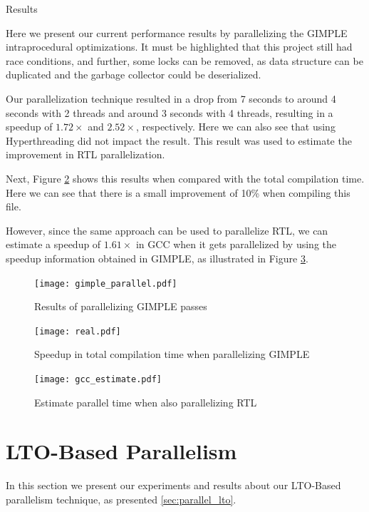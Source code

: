 \begin{subsection}{Results}\label{sec:threaded-results}

Here we present our current performance results by parallelizing the GIMPLE
intraprocedural optimizations. It must be highlighted that this project still had
race conditions, and further, some locks can be
removed, as data structure can be duplicated and the garbage collector could be
deserialized.

Our parallelization technique resulted in a drop from 7 seconds to around 4
seconds with 2 threads and around 3 seconds with 4 threads, resulting in a
speedup of $1.72\times$ and $2.52\times$, respectively. Here we can also see
that using Hyperthreading did not impact the result. This result was used to
estimate the improvement in RTL parallelization.

Next, Figure \ref{fig:parallel_real} shows this results when compared with the
total compilation time. Here we can see that there is a small improvement of
10\% when compiling this file.

However, since the same approach can be used to parallelize RTL, we can
estimate a speedup of $1.61\times$ in GCC when it gets parallelized by using
the speedup information obtained in GIMPLE, as illustrated in Figure
\ref{fig:parallel_estimate}.

\begin{figure}%
 \centering
 \texttt{[image: gimple\_parallel.pdf]}
 \caption{Results of parallelizing GIMPLE passes}
 \label{fig:parallel_gimple}
\end{figure}

\begin{figure}%
 \centering
 \texttt{[image: real.pdf]}
 \caption{Speedup in total compilation time when parallelizing GIMPLE}
 \label{fig:parallel_real}
\end{figure}

\begin{figure}%
 \centering
 \texttt{[image: gcc\_estimate.pdf]}
 \caption{Estimate parallel time when also parallelizing RTL}
 \label{fig:parallel_estimate}
\end{figure}

\end{subsection}

\section{LTO-Based Parallelism}

In this section we present our experiments and results about our
LTO-Based parallelism technique, as presented \ref{sec:parallel_lto}.

